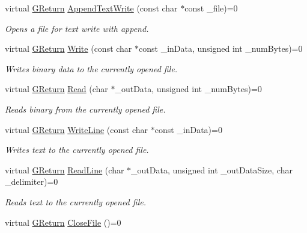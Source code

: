 \begin{DoxyCompactItemize}
virtual \mbox{\hyperlink{namespace_g_w_a67a839e3df7ea8a5c5686613a7a3de21}{G\+Return}} \mbox{\hyperlink{class_g_w_1_1_s_y_s_t_e_m_1_1_g_file_a72e40b3234a2384738d8db6e958f4782}{Append\+Text\+Write}} (const char $\ast$const \+\_\+file)=0
\begin{DoxyCompactList}\small\item\em Opens a file for text write with append. \end{DoxyCompactList}\item 
virtual \mbox{\hyperlink{namespace_g_w_a67a839e3df7ea8a5c5686613a7a3de21}{G\+Return}} \mbox{\hyperlink{class_g_w_1_1_s_y_s_t_e_m_1_1_g_file_ae9906414c159e9f1156b5ff6ad511c31}{Write}} (const char $\ast$const \+\_\+in\+Data, unsigned int \+\_\+num\+Bytes)=0
\begin{DoxyCompactList}\small\item\em Writes binary data to the currently opened file. \end{DoxyCompactList}\item 
virtual \mbox{\hyperlink{namespace_g_w_a67a839e3df7ea8a5c5686613a7a3de21}{G\+Return}} \mbox{\hyperlink{class_g_w_1_1_s_y_s_t_e_m_1_1_g_file_a1aaa026cba3d37abaaa2b408cd5d322d}{Read}} (char $\ast$\+\_\+out\+Data, unsigned int \+\_\+num\+Bytes)=0
\begin{DoxyCompactList}\small\item\em Reads binary from the currently opened file. \end{DoxyCompactList}\item 
virtual \mbox{\hyperlink{namespace_g_w_a67a839e3df7ea8a5c5686613a7a3de21}{G\+Return}} \mbox{\hyperlink{class_g_w_1_1_s_y_s_t_e_m_1_1_g_file_a7c57570575c63ae98f71232660d1b911}{Write\+Line}} (const char $\ast$const \+\_\+in\+Data)=0
\begin{DoxyCompactList}\small\item\em Writes text to the currently opened file. \end{DoxyCompactList}\item 
virtual \mbox{\hyperlink{namespace_g_w_a67a839e3df7ea8a5c5686613a7a3de21}{G\+Return}} \mbox{\hyperlink{class_g_w_1_1_s_y_s_t_e_m_1_1_g_file_ae9e072091ffe55f2f7697cb1d3eaec79}{Read\+Line}} (char $\ast$\+\_\+out\+Data, unsigned int \+\_\+out\+Data\+Size, char \+\_\+delimiter)=0
\begin{DoxyCompactList}\small\item\em Reads text to the currently opened file. \end{DoxyCompactList}\item 
virtual \mbox{\hyperlink{namespace_g_w_a67a839e3df7ea8a5c5686613a7a3de21}{G\+Return}} \mbox{\hyperlink{class_g_w_1_1_s_y_s_t_e_m_1_1_g_file_ae661d107c461145bb095dcfc76519f54}{Close\+File}} ()=0

\end{DoxyCompactItemize}
